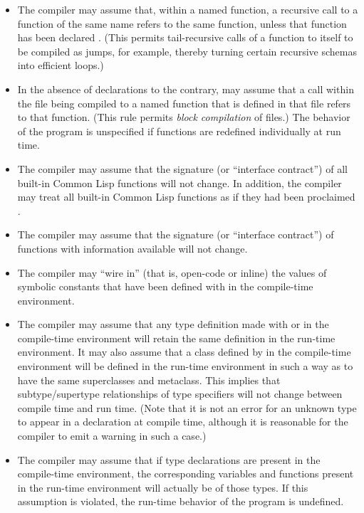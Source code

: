 \begin{newer}
\begin{itemize}
\item The compiler may assume that, within a named function, a
	recursive call to a function of the same name refers to the
	same function, unless that function has been declared .
(This permits tail-recursive calls of a function to itself
to be compiled as jumps, for example, thereby turning certain recursive
schemas into efficient loops.)

\item In the absence of 
	declarations to the contrary,
  may assume that a call within the file being compiled to a named
	function that is defined in that file refers to that function.
	(This rule permits {\it block compilation} of files.)  The behavior of
	the program is unspecified if functions are redefined individually 
	at run time.

\item The compiler may assume that the signature (or ``interface contract'') of
	all built-in Common Lisp functions will not change.  In addition,
	the compiler may treat all built-in Common Lisp functions as if
	they had been proclaimed .

\item The compiler may assume that the signature (or ``interface contract'') of
	functions with  information available will not change.

\item The compiler may ``wire in'' (that is, open-code or inline)
the values of symbolic constants
	that have been defined with  in the compile-time
	environment.

\item The compiler may assume that any type definition made with  
        or  in the compile-time environment will retain the same 
        definition in the run-time environment.  It may also assume that
        a class defined by  in the compile-time environment will
        be defined in the run-time environment in such a way as to have
        the same superclasses and metaclass.  This implies that
        subtype/supertype relationships of type specifiers will not 
        change between compile time and run time.  (Note that it is not 
        an error for an	unknown type to appear in a declaration at
        compile time, although it is reasonable for the compiler to 
        emit a warning in such a case.)

\item The compiler may assume that if type declarations are present
	in the compile-time environment, the corresponding variables and 
	functions present in the run-time environment will actually be of
	those types.  If this assumption is violated, the run-time behavior of the program is 
	undefined.
\end{itemize}


\end{newer}
